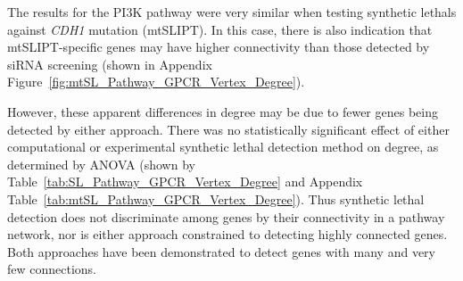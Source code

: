 \begin{table*}[!htb]
\caption{\acrshort{ANOVA} for synthetic lethality and vertex degree}
\label{tab:SL_Pathway_GPCR_Vertex_Degree}
\noindent{}
\end{table*} \filbreak

The results for the PI3K pathway were very similar when testing \glspl{synthetic lethal} against \textit{CDH1} \gls{mutation} (\acrshort{mtSLIPT}). In this case, there is also indication that \acrshort{mtSLIPT}-specific genes may have higher connectivity than those detected by \gls{siRNA} screening (shown in Appendix Figure~\ref{fig:mtSL_Pathway_GPCR_Vertex_Degree}).

However, these apparent differences in  degree may be due to fewer genes being detected by either approach. There was no statistically significant effect of either computational or experimental \gls{synthetic lethal} detection method on  degree, as determined by \gls{ANOVA} (shown by Table~\ref{tab:SL_Pathway_GPCR_Vertex_Degree} and Appendix Table~\ref{tab:mtSL_Pathway_GPCR_Vertex_Degree}). Thus \gls{synthetic lethal} detection does not discriminate among genes by their connectivity in a pathway network, nor is either approach constrained to detecting highly connected genes. Both approaches have been demonstrated to detect genes with many and very few connections.

